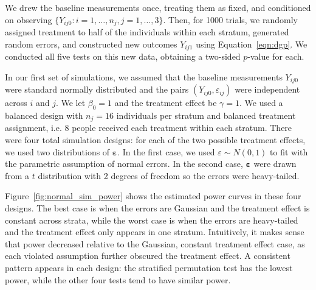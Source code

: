 \documentclass[12pt]{article}
\begin{document}
\noindent We drew the baseline measurements once, treating them as fixed, and conditioned on observing $\{ Y_{ij0} : {i = 1,\dots,n_j, j = 1,\dots, 3}\}$.
Then, for 1000 trials, we randomly assigned treatment to half of the individuals within each stratum, generated random errors, and constructed new outcomes $Y_{ij1}$ using Equation~\ref{eqn:dgp}.
We conducted all five tests on this new data, obtaining a two-sided $p$-value for each.

In our first set of simulations, we assumed that the baseline measurements $Y_{ij0}$ were standard normally distributed and the pairs $(Y_{ij0}, \varepsilon_{ij})$ were independent across $i$ and $j$.
We let $\beta_0 = 1$ and the treatment effect be $\gamma = 1$.
We used a balanced design with $n_j = 16$ individuals per stratum and balanced treatment assignment, i.e. 8 people received each treatment within each stratum.
There were four total simulation designs:
for each of the two possible treatment effects, we used two distributions of $\mathbf{\varepsilon}$.
In the first case, we used $\varepsilon \sim N(0, 1)$ to fit with the parametric assumption of normal errors.
In the second case, $\mathbf{\varepsilon}$ were drawn from a $t$ distribution with 2 degrees of freedom so the errors were heavy-tailed.

Figure~\ref{fig:normal_sim_power} shows the estimated power curves in these four designs.
The best case is when the errors are Gaussian and the treatment effect is constant across strata, while the worst case is when the errors are heavy-tailed and the treatment effect only appears in one stratum.
Intuitively, it makes sense that power decreased relative to the Gaussian, constant treatment effect case, as each violated assumption further obscured the treatment effect.
A consistent pattern appears in each design: the stratified permutation test has the lowest power, while the other four tests tend to have similar power.
\end{document}
